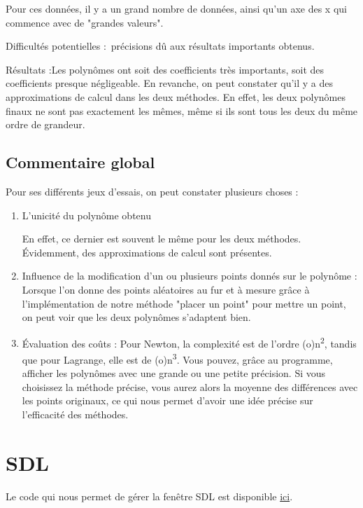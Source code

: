\documentclass[letter]{article}
\begin{document}
Pour ces données, il y a un grand nombre de données, ainsi qu'un axe des x qui commence avec de "grandes valeurs".

Difficultés potentielles : précisions dû aux résultats importants obtenus.


Résultats :Les polynômes ont soit des coefficients très importants, soit des coefficients presque négligeable. En revanche, on peut constater qu'il y a des approximations de calcul dans les deux méthodes. En effet, les deux polynômes finaux ne sont pas exactement les mêmes, même si ils sont tous les deux du même ordre de grandeur.


\subsection{Commentaire global}
\label{sec:org458c2ac}

Pour ses différents jeux d'essais, on peut constater plusieurs choses :

\begin{enumerate}
\item L'unicité du polynôme obtenu

En effet, ce dernier est souvent le même pour les deux méthodes. Évidemment, des approximations de calcul sont présentes.

\item Influence de la modification d'un ou plusieurs points donnés sur le polynôme :
Lorsque l'on donne des points aléatoires au fur et à mesure grâce à l'implémentation de notre méthode "placer un point" pour mettre un point, on peut voir que les deux polynômes s'adaptent bien.

\item Évaluation des coûts :
Pour Newton, la complexité est de l'ordre (o)n\textsuperscript{2}, tandis que pour Lagrange, elle est de (o)n\textsuperscript{3}. 
Vous pouvez, grâce au programme, afficher les polynômes avec une grande ou une petite précision. Si vous choisissez la méthode précise, vous aurez alors la moyenne des différences avec les points originaux, ce qui nous permet d'avoir une idée précise sur l’efficacité des méthodes.
\end{enumerate}

\newpage
\section{SDL}
\label{sec:orgf7f0c61}

Le code qui nous permet de gérer la fenêtre SDL est disponible \href{render.c}{ici}.
\end{document}
